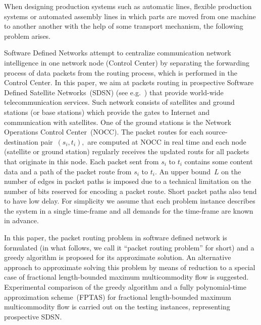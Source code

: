 \documentclass{ifacconf}
\begin{document}
When designing production systems such as automatic lines, flexible
 production systems or automated
 assembly lines in which parts are moved from one machine to another
 another with the help of some transport mechanism, the following problem arises.

Software Defined Networks attempt to centralize communication network intelligence in one network node (Control Center) by separating the forwarding process of data packets from the routing process, which is performed in the Control Center.
In this paper, we aim at packets routing in prospective Software Defined Satellite Networks~(SDSN) (see e.g.~\cite{SXM18,TZYFW14}) that
provide world-wide telecommunication services. Such
network consists of satellites and ground stations (or base stations) which provide the gates to Internet and communication with satellites. One of the ground stations is the Network Operations
Control Center~(NOCC). The packet routes for each
source-destination pair~$(s_i,t_i),$ are computed at NOCC in
real time and each node (satellite or ground station) regularly
receives the updated routs for all packets that originate in this
node. Each packet sent from $s_i$ to $t_i$ contains some content
data and a path of the packet route from $s_i$ to $t_i.$ An upper
bound~$L$ on the number of edges in packet paths is imposed due to
a technical limitation on the number of bits reserved for
encoding a packet route. Short packet paths also tend to have low
delay. For simplicity we assume that each problem
instance describes the system in a single time-frame and all
demands for the time-frame are known in advance.


In this paper, the packet routing problem in software defined network is formulated (in what follows, we call it ``packet routing problem'' for short) and a greedy algorithm is proposed for its approximate solution.
An alternative approach to approximate solving this problem by means of reduction to a special case of 
fractional length-bounded maximum multicommodity flow is suggested. Experimental comparison of the greedy algorithm 
and a fully polynomial-time approximation scheme~(FPTAS) for 
fractional length-bounded maximum multicommodity flow is carried out on the testing instances,
representing prospective SDSN.
\end{document}
